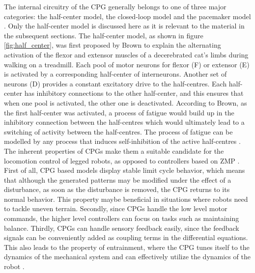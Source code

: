 \documentclass[12pt,twoside]{article}
\theoremstyle{plain}
\theoremstyle{definition}
\theoremstyle{remark}
\newcommand{\forceindent}{\leavevmode{\parindent=2em\indent}}
\begin{document}
\forceindent The internal circuitry of the CPG generally belongs to one of three major categories: the half-center model, the closed-loop model and the pacemaker model \cite{neurobiology1994shepherd}. Only the half-center model is discussed here as it is relevant to the material in the subsequent sections. The half-center model, as shown in figure \ref{fig:half_center}, was first proposed by Brown \cite{brown1914nature} to explain the alternating activation of the flexor and extensor muscles of a decerebrated cat's limbs during walking on a treadmill. Each pool of motor neurons for flexor (F) or extensor (E) is activated by a corresponding half-center of interneurons. Another set of neurons (D) provides a constant excitatory drive to the half-centres. Each half-center has inhibitory connections to the other half-center, and this ensures that when one pool is activated, the other one is deactivated. According to Brown, as the first half-center was activated, a process of fatigue would build up in the inhibitory connection between the half-centres which would ultimately lead to a switching of activity between the half-centres. The process of fatigue can be modelled by any process that induces self-inhibition of the active half-centres \cite{neurobiology1994shepherd}.\\
\forceindent The inherent properties of CPGs make them a suitable candidate for the locomotion control of legged robots, as opposed to controllers based on ZMP \cite{Ijspeert2008}. First of all, CPG based models display stable limit cycle behavior, which means that although the generated patterns may be modified under the effect of a disturbance, as soon as the disturbance is removed, the CPG returns to its normal behavior. This property maybe beneficial in situations where robots need to tackle uneven terrain. Secondly, since CPGs handle the low level motor commands, the higher level controllers can focus on tasks such as maintaining balance. Thirdly, CPGs can handle sensory feedback easily, since the feedback signals can be conveniently added as coupling terms in the differential equations. This also leads to the property of entrainment, where the CPG tunes itself to the dynamics of the mechanical system and can effectively utilize the dynamics of the robot \cite{Ijspeert2008}.
\end{document}
